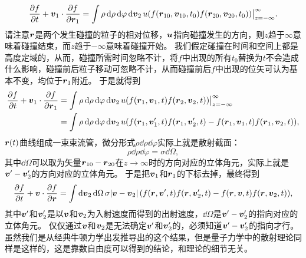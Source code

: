 \[
    \pdv{f}{t} + \vb*{v}_1 \cdot \pdv{f}{\vb*{r}_1} = \int \rho \dd{\rho} \dd{\varphi} \dd{\vb*{v}_2} u (f(\vb*{r}_{10}, \vb*{v}_{10}, t_0) f(\vb*{r}_{20}, \vb*{v}_{20}, t_0))\big|_{z=-\infty}^\infty.
\]
请注意$\vb*{r}$是两个发生碰撞的粒子的相对位移，$\vb*{u}$指向碰撞发生的方向，则$z$趋于$\infty$意味着碰撞结束，而$z$趋于$-\infty$意味着碰撞开始。
我们假定碰撞在时间和空间上都是高度定域的，从而，碰撞所需时间忽略不计，将$f$中出现的所有$t_0$替换为$t$不会造成什么影响，碰撞前后粒子移动可忽略不计，从而碰撞前后$f$中出现的位矢可认为基本不变，均位于$\vb*{r}_1$附近。
于是就得到
\[
    \begin{aligned}
        \pdv{f}{t} + \vb*{v}_1 \cdot \pdv{f}{\vb*{r}_1} &= \int \rho \dd{\rho} \dd{\varphi} \dd{\vb*{v}_2} u (f(\vb*{r}_{1}, \vb*{v}_{1}, t) f(\vb*{r}_{2}, \vb*{v}_{2}, t))\big|_{z=-\infty}^\infty \\
        &= \int \rho \dd{\rho} \dd{\varphi} \dd{\vb*{v}_2} u (f(\vb*{r}_{1}, \vb*{v}'_{1}, t) f(\vb*{r}_{1}, \vb*{v}'_{2}, t) - f(\vb*{r}_{1}, \vb*{v}_{1}, t) f(\vb*{r}_{1}, \vb*{v}_{2}, t)),
    \end{aligned}
\]
$\vb*{r}(t)$曲线组成一束束流管，微分形式$\rho \dd{\rho} \dd{\varphi}$实际上就是散射截面：
\begin{equation}
    \rho \dd{\rho} \dd{\varphi} = \sigma \dd{\Omega},
\end{equation}
其中$\dd{\Omega}$可以取为矢量$\vb*{r}_{10} - \vb*{r}_{20}$在$z \to \infty$时的方向对应的立体角元，实际上就是$\vb*{v}' - \vb*{v}'_2$的方向对应的立体角元。
于是把$\vb*{v}_1$和$\vb*{r}_1$的下标去掉，最终得到
\begin{equation}
    \pdv{f}{t} + \vb*{v} \cdot \pdv{f}{\vb*{r}} = \int \dd{\vb*{v}_2} \dd{\Omega} \sigma \abs*{\vb*{v}-\vb*{v}_2} (f(\vb*{r}, \vb*{v}', t) f(\vb*{r}, \vb*{v}'_{2}, t) - f(\vb*{r}, \vb*{v}, t) f(\vb*{r}, \vb*{v}_{2}, t)),
\end{equation}
其中$\vb*{v}'$和$\vb*{v}_2'$是以$\vb*{v}$和$\vb*{v}_2$为入射速度而得到的出射速度，$\dd{\Omega}$是$\vb*{v}' - \vb*{v}_2'$的指向对应的立体角元。
仅仅通过$\vb*{v}$和$\vb*{v}_2$是无法确定$\vb*{v}'$和$\vb*{v}_2'$的，必须知道$\vb*{v}' - \vb*{v}_2'$的指向才行。
虽然我们是从经典牛顿力学出发推导出的这个结果，但是量子力学中的散射理论同样是这样的，这是靠数自由度可以得到的结论，和理论的细节无关。

